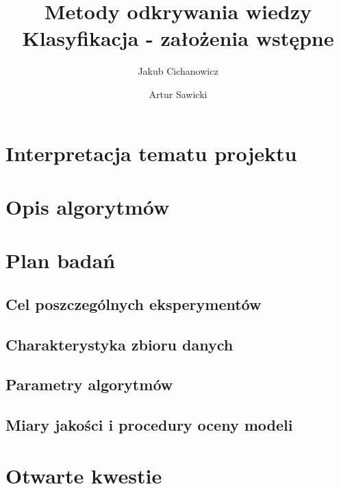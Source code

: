 \documentclass{article}
\begin{document}
\title{Metody odkrywania wiedzy \\%
{\large Klasyfikacja - założenia wstępne} }

\author{Jakub Cichanowicz \and Artur Sawicki}

\maketitle

\section{Interpretacja tematu projektu}

\section{Opis algorytmów}

\section{Plan badań}

\subsection{Cel poszczególnych eksperymentów}
\subsection{Charakterystyka zbioru danych}
\subsection{Parametry algorytmów}
\subsection{Miary jakości i procedury oceny modeli}

\section{Otwarte kwestie}
\end{document}
